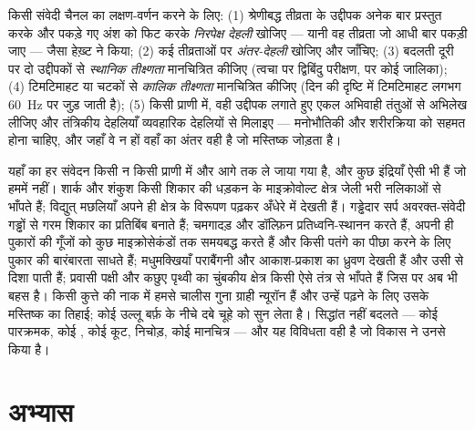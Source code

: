 \begin{method}[किसी संवेदन का मापन]\label{met:b3:sensory-systems:psychophysics}
किसी संवेदी चैनल का लक्षण-वर्णन करने के लिए: (1) श्रेणीबद्ध तीव्रता के
उद्दीपक अनेक बार प्रस्तुत करके और पकड़े गए अंश को फिट करके
\emph{निरपेक्ष देहली} खोजिए --- यानी वह तीव्रता जो आधी बार पकड़ी जाए
--- जैसा हेख़्ट ने किया; (2) कई तीव्रताओं पर \emph{अंतर-देहली} खोजिए और
 जाँचिए; (3) बदलती दूरी पर दो उद्दीपकों से \emph{स्थानिक
तीक्ष्णता} मानचित्रित कीजिए (त्वचा पर द्विबिंदु परीक्षण,  पर
कोई जालिका); (4) टिमटिमाहट या चटकों से \emph{कालिक तीक्ष्णता}
मानचित्रित कीजिए (दिन की दृष्टि में टिमटिमाहट लगभग \qty{60}{Hz} पर
जुड़ जाती है); (5) किसी प्राणी में, वही उद्दीपक लगाते हुए एकल अभिवाही
तंतुओं से अभिलेख लीजिए और तंत्रिकीय देहलियाँ व्यवहारिक देहलियों से
मिलाइए --- मनोभौतिकी और शरीरक्रिया को सहमत होना चाहिए, और जहाँ वे न
हों वहाँ का अंतर वही है जो मस्तिष्क जोड़ता है।
\end{method}

\begin{remark}[दूसरे प्राणी, दूसरी इंद्रियाँ]\label{rem:b3:sensory-systems:others}
यहाँ का हर संवेदन किसी न किसी प्राणी में और आगे तक ले जाया गया है, और
कुछ इंद्रियाँ ऐसी भी हैं जो हममें नहीं। शार्क और शंकुश किसी शिकार की
धड़कन के माइक्रोवोल्ट क्षेत्र जेली भरी नलिकाओं से भाँपते हैं; विद्युत्
मछलियाँ अपने ही क्षेत्र के विरूपण पढ़कर अँधेरे में देखती हैं।
गड्ढेदार सर्प अवरक्त-संवेदी गड्ढों से गरम शिकार का प्रतिबिंब बनाते
हैं; चमगादड़ और डॉल्फ़िन प्रतिध्वनि-स्थानन करते हैं, अपनी ही पुकारों
की गूँजों को कुछ माइक्रोसेकंडों तक समयबद्ध करते हैं और किसी पतंगे का
पीछा करने के लिए पुकार की बारंबारता साधते हैं; मधुमक्खियाँ पराबैंगनी
और आकाश-प्रकाश का ध्रुवण देखती हैं और उसी से दिशा पाती हैं; प्रवासी
पक्षी और कछुए पृथ्वी का चुंबकीय क्षेत्र किसी ऐसे तंत्र से भाँपते हैं
जिस पर अब भी बहस है। किसी कुत्ते की नाक में हमसे चालीस गुना ग्राही
न्यूरॉन हैं और उन्हें पढ़ने के लिए उसके मस्तिष्क का तिहाई; कोई उल्लू
बर्फ़ के नीचे दबे चूहे को सुन लेता है। सिद्धांत नहीं बदलते --- कोई
पारक्रमक, कोई , कोई कूट, निचोड़, कोई मानचित्र --- और यह
विविधता वही है जो विकास ने उनसे किया है।
\end{remark}

\section{अभ्यास}

